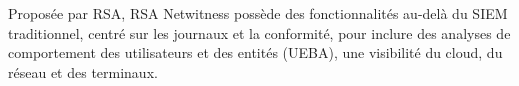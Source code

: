 Proposée par RSA, RSA Netwitness possède des fonctionnalités au-delà du SIEM traditionnel, centré sur les journaux et la conformité, pour inclure des analyses de comportement des utilisateurs et des entités (UEBA), une visibilité du cloud, du réseau et des terminaux.
